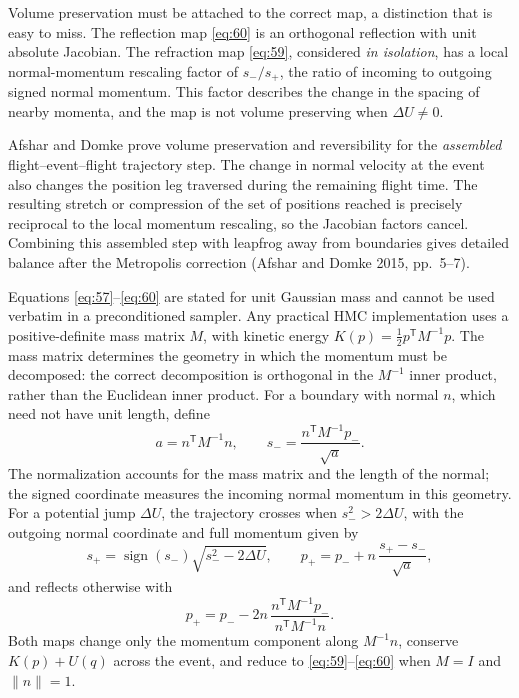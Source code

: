 \documentclass[11pt]{article}
\begin{document}
Volume preservation must be attached to the correct map, a distinction that
is easy to miss. The reflection map \eqref{eq:60} is an orthogonal reflection
with unit absolute Jacobian. The refraction map \eqref{eq:59}, considered
\emph{in isolation}, has a local normal-momentum rescaling factor of
$s_-/s_+$, the ratio of incoming to outgoing signed normal momentum. This
factor describes the change in the spacing of nearby momenta, and the map
is not volume preserving when $\Delta U\neq0$.

Afshar and Domke prove volume preservation and reversibility for the
\emph{assembled} flight--event--flight trajectory step. The change in normal
velocity at the event also changes the position leg traversed during the
remaining flight time. The resulting stretch or compression of the set of
positions reached is precisely reciprocal to the local momentum rescaling,
so the Jacobian factors cancel. Combining this assembled step with leapfrog
away from boundaries gives detailed balance after the Metropolis correction
(Afshar and Domke 2015, pp.~5--7).

Equations \eqref{eq:57}--\eqref{eq:60} are stated for unit Gaussian mass and
cannot be used verbatim in a preconditioned sampler. Any practical HMC
implementation uses a positive-definite mass matrix $M$, with kinetic
energy $K(p)=\tfrac12 p^{\mathsf T}M^{-1}p$. The mass matrix determines the geometry in which the
momentum must be decomposed: the correct decomposition is orthogonal in the
$M^{-1}$ inner product, rather than the Euclidean inner product.
For a boundary with normal $n$, which need not have unit length, define
\begin{equation}\label{eq:60a}
 a=n^{\mathsf T}M^{-1}n,
 \qquad
 s_-=\frac{n^{\mathsf T}M^{-1}p_-}{\sqrt a}.
\end{equation}
The normalization accounts for the mass matrix and the length of the normal;
the signed coordinate measures the incoming normal momentum in this geometry.
For a potential jump $\Delta U$, the trajectory crosses when
$s_-^2>2\Delta U$, with the outgoing normal coordinate and full momentum given by
\begin{equation}\label{eq:60b}
 s_+=\operatorname{sign}(s_-)\sqrt{s_-^2-2\Delta U},
 \qquad
 p_+=p_-+n\,\frac{s_+-s_-}{\sqrt a},
\end{equation}
and reflects otherwise with
\begin{equation}\label{eq:60c}
 p_+=p_--2n\,\frac{n^{\mathsf T}M^{-1}p_-}{n^{\mathsf T}M^{-1}n}.
\end{equation}
Both maps change only the momentum component along $M^{-1}n$, conserve
$K(p)+U(q)$ across the event, and reduce to \eqref{eq:59}--\eqref{eq:60}
when $M=I$ and $\|n\|=1$.
\end{document}
